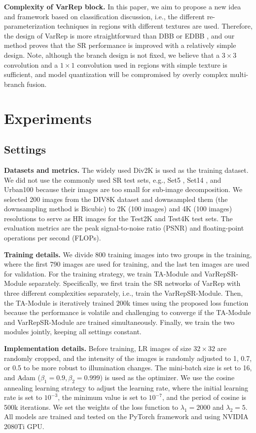 \documentclass[sn-mathphys]{sn-jnl}%
\theoremstyle{thmstyleone}%
\theoremstyle{thmstyletwo}%
\theoremstyle{thmstylethree}%
\begin{document}
\textbf{Complexity of VarRep block.} In this paper, we aim to propose a new idea and framework based on classification discussion, i.e., the different re-parameterization techniques in regions with different textures are used. Therefore, the design of VarRep is more straightforward than DBB \citep{DBB} or EDBB \citep{EDBB}, and our method proves that the SR performance is improved with a relatively simple design. Note, although the branch design is not fixed, we believe that a $3\times3$ convolution and a $1\times1$ convolution used in regions with simple texture is sufficient, and model quantization will be compromised by overly complex multi-branch fusion.


\section{Experiments}
\subsection{Settings}
\textbf{Datasets and metrics.} The widely used Div2K \cite{Div2K} is used as the training dataset. We did not use the commonly used SR test sets, e.g., Set5 \cite{set5}, Set14 \cite{set14}, and Urban100 \cite{urban100} because their images are too small for sub-image decomposition. We selected 200 images from the DIV8K \cite{div8k} dataset and downsampled them (the downsampling method is Bicubic) to 2K (100 images) and 4K (100 images) resolutions to serve as HR images for the Test2K and Test4K test sets. The evaluation metrics are the peak signal-to-noise ratio (PSNR) and floating-point operations per second (FLOPs). 

\textbf{Training details.} We divide 800 training images into two groups in the training, where the first 790 images are used for training, and the last ten images are used for validation. For the training strategy, we train TA-Module and VarRepSR-Module separately. Specifically, we first train the SR networks of VarRep with three different complexities separately, i.e., train the VarRepSR-Module. Then, the TA-Module is iteratively trained 200k times using the proposed loss function because the performance is volatile and challenging to converge if the TA-Module and VarRepSR-Module are trained simultaneously. Finally, we train the two modules jointly, keeping all settings constant.

\textbf{Implementation details.} Before training, LR images of size $32\times32$ are randomly cropped, and the intensity of the images is randomly adjusted to 1, 0.7, or 0.5 to be more robust to illumination changes. The mini-batch size is set to 16, and Adam \cite{adam} ($\beta_1=0.9, \beta_2=0.999$) is used as the optimizer. We use the cosine annealing learning strategy to adjust the learning rate, where the initial learning rate is set to $10^{-3}$, the minimum value is set to $10^{-7}$, and the period of cosine is 500k iterations. We set the weights of the loss function to $\lambda_1=2000$ and $\lambda_2=5$. All models are trained and tested on the PyTorch \cite{pytorch} framework and using NVIDIA 2080Ti GPU.
\end{document}
